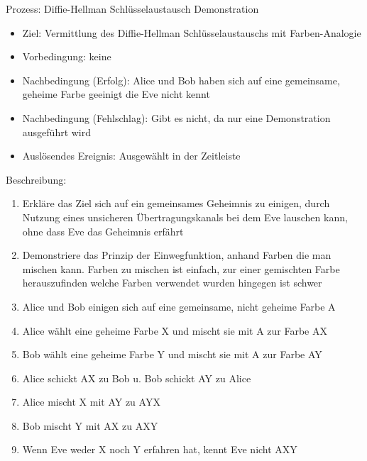 \documentclass{article}
\begin{document}
\begin{FA}[start=130]
\item Prozess: Diffie-Hellman Schlüsselaustausch Demonstration
\end{FA}
\begin{itemize}[label={}]
    \item Ziel: Vermittlung des Diffie-Hellman Schlüsselaustauschs mit Farben-Analogie
    \item Vorbedingung: keine
    \item Nachbedingung (Erfolg): Alice und Bob haben sich auf eine
        gemeinsame, geheime Farbe geeinigt die Eve nicht kennt
    \item Nachbedingung (Fehlschlag): Gibt es nicht, da nur
        eine Demonstration ausgeführt wird
    \item Auslösendes Ereignis: Ausgewählt in der Zeitleiste
\end{itemize}

Beschreibung:
\begin{enumerate}
    \item Erkläre das Ziel sich auf ein gemeinsames Geheimnis zu einigen,
        durch Nutzung eines unsicheren Übertragungskanals
        bei dem Eve lauschen kann, ohne dass Eve das Geheimnis erfährt
    \item Demonstriere das Prinzip der Einwegfunktion, anhand Farben die man mischen
        kann. Farben zu mischen ist einfach, zur einer gemischten Farbe
        herauszufinden welche Farben verwendet wurden hingegen ist schwer
    \item Alice und Bob einigen sich auf eine gemeinsame, nicht geheime Farbe A
    \item Alice wählt eine geheime Farbe X und mischt sie mit A zur Farbe AX
    \item Bob wählt eine geheime Farbe Y und mischt sie mit A zur Farbe AY
    \item Alice schickt AX zu Bob u. Bob schickt AY zu Alice
    \item Alice mischt X mit AY zu AYX
    \item Bob mischt Y mit AX zu AXY
    \item Wenn Eve weder X noch Y erfahren hat, kennt Eve nicht AXY
\end{enumerate}
\end{document}
